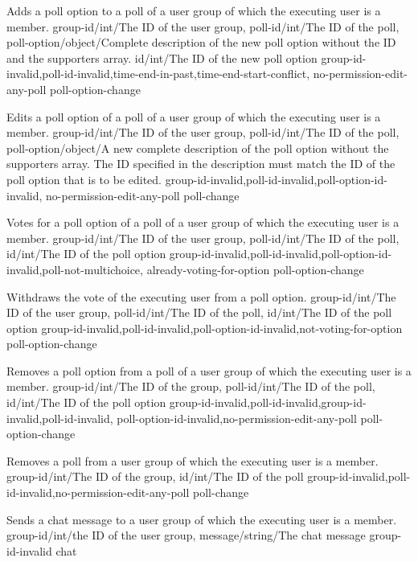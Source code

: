 \documentclass[parskip=full,11pt]{scrartcl}
\begin{document}
{Adds a poll option to a poll of a user group of which the executing user is a
member.}
{group-id/int/The ID of the user group,
poll-id/int/The ID of the poll,
poll-option/object/Complete description of the new poll option without the ID and the
supporters array.}
{id/int/The ID of the new poll option}
{group-id-invalid,poll-id-invalid,time-end-in-past,time-end-start-conflict,
no-permission-edit-any-poll}
{poll-option-change}

{Edits a poll option of a poll of a user group of which the executing user is
a member.}
{group-id/int/The ID of the user group,
poll-id/int/The ID of the poll,
poll-option/object/A new complete description of the poll option without the
supporters array.
The ID specified in the description must match the ID of the poll option that
is to be edited.}
{}
{group-id-invalid,poll-id-invalid,poll-option-id-invalid,%
no-permission-edit-any-poll}
{poll-change}

{Votes for a poll option of a poll of a user group of which the executing user
is a member.}
{group-id/int/The ID of the user group,
poll-id/int/The ID of the poll,
id/int/The ID of the poll option}
{}
{group-id-invalid,poll-id-invalid,poll-option-id-invalid,poll-not-multichoice,
already-voting-for-option}
{poll-option-change}

{Withdraws the vote of the executing user from a poll option.}
{group-id/int/The ID of the user group,
poll-id/int/The ID of the poll,
id/int/The ID of the poll option}
{}
{group-id-invalid,poll-id-invalid,poll-option-id-invalid,not-voting-for-option}
{poll-option-change}

{Removes a poll option from a poll of a user group of which the executing user
is a member.}
{group-id/int/The ID of the group,
poll-id/int/The ID of the poll,
id/int/The ID of the poll option}
{}
{group-id-invalid,poll-id-invalid,group-id-invalid,poll-id-invalid,
poll-option-id-invalid,no-permission-edit-any-poll}
{poll-option-change}

{Removes a poll from a user group of which the executing user is a member.}
{group-id/int/The ID of the group,
id/int/The ID of the poll}
{}
{group-id-invalid,poll-id-invalid,no-permission-edit-any-poll}
{poll-change}

{Sends a chat message to a user group of which the executing user is a member.}
{group-id/int/the ID of the user group,
message/string/The chat message}
{}
{group-id-invalid}
{chat}
\end{document}
